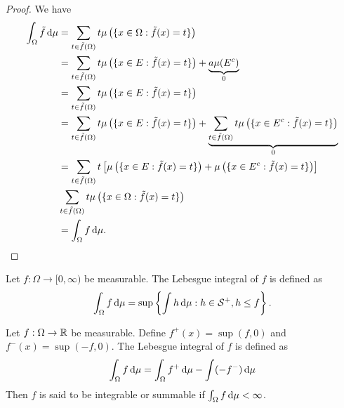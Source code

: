 \begin{proof}
  We have
  \begin{align*}
    \int_\Omega \tilde{f} \,\mathrm{d} \mu
     & = \sum\limits_{t\in \tilde{f}(\Omega)} t\mu\left(\{x\in \Omega : \tilde{f}(x) = t\}\right)                                                                                                \\
     & = \sum\limits_{t\in \tilde{f}(\Omega)} t\mu\left(\{x\in E : \tilde{f}(x) = t\}\right) + \underbrace{a\mu(E^c)}_{0}                                                                        \\
     & = \sum\limits_{t\in \tilde{f}(\Omega)} t\mu\left(\{x\in E : \tilde{f}(x) = t\}\right)                                                                                                     \\
     & = \sum\limits_{t\in \tilde{f}(\Omega)} t\mu\left(\{x\in E : \tilde{f}(x) = t\}\right) + \underbrace{\sum\limits_{t\in \tilde{f}(\Omega)} t\mu\left(\{x\in E^c : \tilde{f}(x) = t\}\right)
    }_{0}                                                                                                                                                                                        \\
     & = \sum\limits_{t\in \tilde{f}(\Omega)} t\left[\mu\left(\{x\in E : \tilde{f}(x) = t\}\right) + \mu\left(\{x\in E^c : \tilde{f}(x) = t\}\right)\right]                                      \\
     & \sum\limits_{t\in \tilde{f}(\Omega)} t\mu\left(\{x\in \Omega : \tilde{f}(x) = t\}\right)                                                                                                  \\
     & = \int_\Omega f \,\mathrm{d} \mu.
  \end{align*}
\end{proof}

\begin{definition}
  Let $f:\Omega\to[0,\infty)$ be measurable. The Lebesgue integral of $f$ is defined as
  \begin{equation}
    \int_\Omega f\,\mathrm{d} \mu = \sup\left\{\int\limits h\,\mathrm{d} \mu : h\in\mathcal{S}^+, h\le f\right\}.
  \end{equation}
\end{definition}

\begin{definition}
  Let $f:\Omega\to\mathbb{R}$ be measurable. Define $f^+(x) = \sup(f,0)$ and $f^-(x) = \sup(-f,0)$. The Lebesgue integral of $f$ is defined as
  \begin{equation}
    \int_\Omega f\,\mathrm{d} \mu = \int_\Omega f^+\,\mathrm{d} \mu - \int(-f^-)\,\mathrm{d} \mu
  \end{equation}
  Then $f$ is said to be integrable or summable if $\int_\Omega f\,\mathrm{d} \mu<\infty$.
\end{definition}

